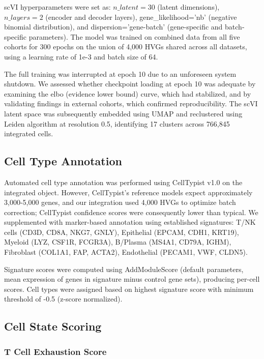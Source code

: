 \documentclass[12pt,twoside]{article}
\begin{document}
scVI hyperparameters were set as: $n\_latent=30$ (latent dimensions), $n\_layers=2$ (encoder and decoder layers), gene\_likelihood='nb' (negative binomial distribution), and dispersion='gene-batch' (gene-specific and batch-specific parameters). The model was trained on combined data from all five cohorts for 300 epochs on the union of 4,000 HVGs shared across all datasets, using a learning rate of 1e-3 and batch size of 64.

The full training was interrupted at epoch 10 due to an unforeseen system shutdown. We assessed whether checkpoint loading at epoch 10 was adequate by examining the elbo (evidence lower bound) curve, which had stabilized, and by validating findings in external cohorts, which confirmed reproducibility. The scVI latent space was subsequently embedded using UMAP and reclustered using Leiden algorithm at resolution 0.5, identifying 17 clusters across 766,845 integrated cells.

\subsection{Cell Type Annotation}

Automated cell type annotation was performed using CellTypist v1.0 on the integrated object. However, CellTypist's reference models expect approximately 3,000-5,000 genes, and our integration used 4,000 HVGs to optimize batch correction; CellTypist confidence scores were consequently lower than typical. We supplemented with marker-based annotation using established signatures: T/NK cells (CD3D, CD8A, NKG7, GNLY), Epithelial (EPCAM, CDH1, KRT19), Myeloid (LYZ, CSF1R, FCGR3A), B/Plasma (MS4A1, CD79A, IGHM), Fibroblast (COL1A1, FAP, ACTA2), Endothelial (PECAM1, VWF, CLDN5).

Signature scores were computed using AddModuleScore (default parameters, mean expression of genes in signature minus control gene sets), producing per-cell scores. Cell types were assigned based on highest signature score with minimum threshold of -0.5 (z-score normalized).

\subsection{Cell State Scoring}

\subsubsection{T Cell Exhaustion Score}
\end{document}
